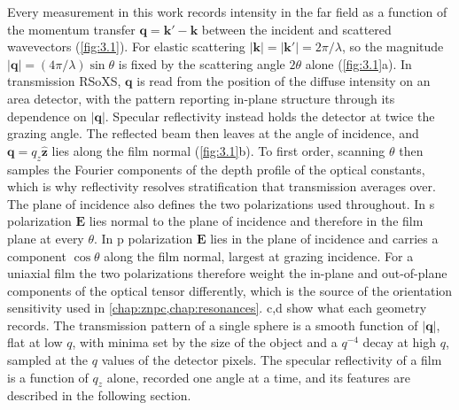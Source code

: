 Every measurement in this work records intensity in the far field as a function of the momentum transfer \(\mathbf{q} = \mathbf{k}' - \mathbf{k}\) between the incident and scattered wavevectors (\cref{fig:3.1}). For elastic scattering \(\left| \mathbf{k} \right| = \left| \mathbf{k}' \right| = 2\pi/\lambda\), so the magnitude \(\left| \mathbf{q} \right| = (4\pi/\lambda)\sin\theta\) is fixed by the scattering angle \(2\theta\) alone (\cref{fig:3.1}a).\autocite{attwoodSoftXRaysExtreme1999} In transmission RSoXS, \(\mathbf{q}\) is read from the position of the diffuse intensity on an area detector, with the pattern reporting in-plane structure through its dependence on \(\left| \mathbf{q} \right|\).\autocite{collinsPolarizedXrayScattering2012,gannOriginsPolarizationdependentAnisotropic2016,grabnerResonantSoftXRay2025} Specular reflectivity instead holds the detector at twice the grazing angle. The reflected beam then leaves at the angle of incidence, and \(\mathbf{q} = q_{z}\widehat{\mathbf{z}}\) lies along the film normal (\cref{fig:3.1}b). To first order, scanning \(\theta\) then samples the Fourier components of the depth profile of the optical constants, which is why reflectivity resolves stratification that transmission averages over.\autocite{wangSoftXrayResonant2005,wangResonantSoftXray2007} The plane of incidence also defines the two polarizations used throughout. In s polarization \(\mathbf{E}\) lies normal to the plane of incidence and therefore in the film plane at every \(\theta\). In p polarization \(\mathbf{E}\) lies in the plane of incidence and carries a component \(\cos\theta\) along the film normal, largest at grazing incidence. For a uniaxial film the two polarizations therefore weight the in-plane and out-of-plane components of the optical tensor differently, which is the source of the orientation sensitivity used in \cref{chap:znpc,chap:resonances}.\autocite{mezgerMolecularOrientationSoft2011,thelenMolecularOrientationDepth2020} c,d show what each geometry records. The transmission pattern of a single sphere is a smooth function of \(|\mathbf{q}|\), flat at low \(q\), with minima set by the size of the object and a \(q^{-4}\) decay at high \(q\), sampled at the \(q\) values of the detector pixels. The specular reflectivity of a film is a function of \(q_{z}\) alone, recorded one angle at a time, and its features are described in the following section.

